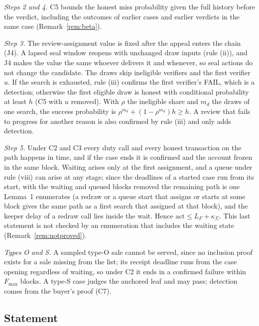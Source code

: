 \documentclass[10pt,a4paper]{article}
\newcommand{\Fmax}{F_{\max}}
\newcommand{\kS}{\kappa_{\Sigma}}
\theoremstyle{plain}
\theoremstyle{remark}
\begin{document}
\emph{Steps 2 and 4.} C5 bounds the honest miss probability given the full history before the verdict, including the outcomes of earlier cases and earlier verdicts in the same case (Remark~\ref{rem:beta}).

\emph{Step 3.} The review-assignment value is fixed after the appeal enters the chain (J4). A lapsed seal window reopens with unchanged draw inputs (rule (ii)), and J4 makes the value the same whoever delivers it and whenever, so seal actions do not change the candidate. The draws skip ineligible verifiers and the first verifier $u$. If the search is exhausted, rule (iii) confirms the first verifier's FAIL, which is a detection; otherwise the first eligible draw is honest with conditional probability at least $h$ (C5 with $u$ removed). With $\rho$ the ineligible share and $m_d$ the draws of one search, the success probability is $\rho^{m_d}+(1-\rho^{m_d})h\ge h$. A review that fails to progress for another reason is also confirmed by rule (iii) and only adds detection.

\emph{Step 5.} Under C2 and C3 every duty call and every honest transaction on the path happens in time, and if the case ends it is confirmed and the account frozen in the same block. Waiting arises only at the first assignment, and a queue under rule (viii) can arise at any stage; since the deadlines of a started case run from its start, with the waiting and queued blocks removed the remaining path is one Lemma~1 enumerates (a redraw or a queue start that assigns or starts at some block gives the same path as a first search that assigned at that block), and the keeper delay of a redraw call lies inside the wait. Hence $\mathrm{act}\le L_F+\kS$. This last statement is not checked by an enumeration that includes the waiting state (Remark~\ref{rem:notproved}).

\emph{Types O and S.} A sampled type-O sale cannot be served, since no inclusion proof exists for a sale missing from the list; its receipt deadline runs from the case opening regardless of waiting, so under C2 it ends in a confirmed failure within $\Fmax$ blocks. A type-S case judges the anchored leaf and may pass; detection comes from the buyer's proof (C7).

\subsection{Statement}
\end{document}

